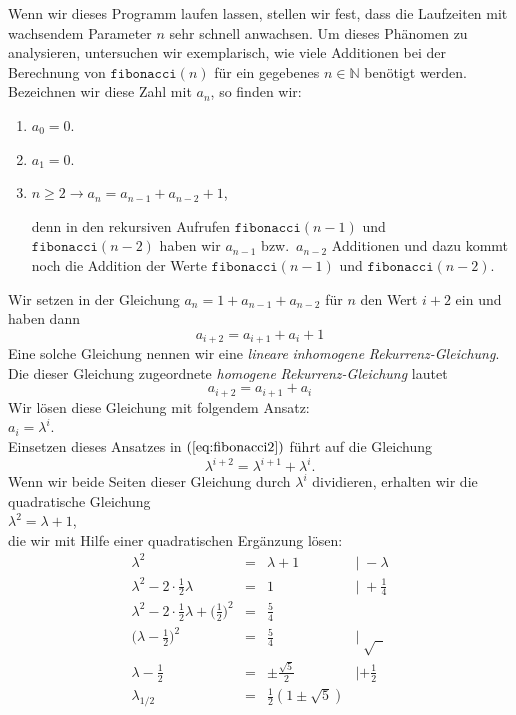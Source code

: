 Wenn wir dieses Programm laufen lassen, stellen wir fest, dass die Laufzeiten mit
wachsendem Parameter $n$ sehr schnell anwachsen.  Um dieses Phänomen zu analysieren,
untersuchen wir exemplarisch, wie viele Additionen bei der Berechnung von
$\texttt{fibonacci}(n)$ für ein gegebenes $n \in \mathbb{N}$ benötigt werden.  Bezeichnen wir
diese Zahl mit $a_n$, so finden wir:
\begin{enumerate}
\item $a_0 = 0$.
\item $a_1 = 0$.
\item $n \geq 2 \rightarrow a_n = a_{n-1} + a_{n-2} + 1$,

      denn in den rekursiven Aufrufen $\texttt{fibonacci}(n-1)$ und $\texttt{fibonacci}(n-2)$ haben wir 
      $a_{n-1}$ bzw.~$a_{n-2}$ Additionen und dazu kommt noch die Addition der Werte
      $\texttt{fibonacci}(n-1)$ und $\texttt{fibonacci}(n-2)$.
\end{enumerate}
Wir setzen in der  Gleichung $a_n = 1 + a_{n-1} + a_{n-2}$ für $n$ den Wert $i+2$ ein und
haben dann 
\begin{equation}
  \label{eq:fibonacci1}
 a_{i+2} = a_{i+1} + a_i + 1  
\end{equation}
Eine solche Gleichung nennen wir eine \emph{lineare} \emph{inhomogene}
\emph{Rekur\-renz-Gleichung}.   Die dieser Gleichung zugeordnete \emph{homogene}
\emph{Rekurrenz-Gleichung} lautet 
\begin{equation}
  \label{eq:fibonacci2}
 a_{i+2} = a_{i+1} + a_i   
\end{equation}
Wir lösen diese Gleichung mit folgendem Ansatz: \\[0.2cm]
\hspace*{1.3cm} $a_i = \lambda^i$. \\[0.2cm]
Einsetzen dieses Ansatzes in $(\ref{eq:fibonacci2})$ führt auf die Gleichung 
\[ \lambda^{i+2} = \lambda^{i+1} + \lambda^i. \]
Wenn wir beide Seiten  dieser Gleichung durch $\lambda^i$ dividieren, erhalten wir die
quadratische Gleichung \\[0.2cm]
\hspace*{1.3cm} $\lambda^2 = \lambda + 1$, \\[0.2cm]
die wir mit Hilfe einer quadratischen Ergänzung lösen: \\[0.2cm]
\[\begin{array}{lcll}
  \lambda^2     & = & \lambda + 1                               & |\;- \lambda \\[0.2cm]
  \lambda^2 - 2 \cdot \frac{1}{2} \lambda & = & 1                   & |\;+ \frac{1}{4} \\[0.2cm]
  \lambda^2 - 2 \cdot \frac{1}{2} \lambda + \Big(\frac{1}{2}\Big)^2 & = &  \frac{5}{4} &  \\[0.2cm]
  \Big(\lambda -\frac{1}{2}\Big)^2 & = & \frac{5}{4}         & |\;\sqrt{\;\;} \\[0.2cm]
  \lambda -\frac{1}{2} & = & \pm\frac{\sqrt{5}}{2}           & | + \frac{1}{2} \\[0.2cm]
  \lambda_{1/2}  & = & \frac{1}{2} (1 \pm \sqrt{5}) & \\
 \end{array}
\]
